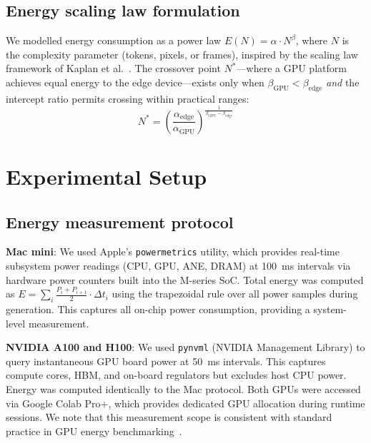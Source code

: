 \documentclass[preprint,12pt]{elsarticle}
\begin{document}
\subsection{Energy scaling law formulation}

We modelled energy consumption as a power law $E(N) = \alpha \cdot N^\beta$, where $N$ is the complexity parameter (tokens, pixels, or frames), inspired by the scaling law framework of Kaplan et al.~\cite{kaplan2020scaling}. The crossover point $N^*$---where a GPU platform achieves equal energy to the edge device---exists only when $\beta_\text{GPU} < \beta_\text{edge}$ \textit{and} the intercept ratio permits crossing within practical ranges:
\begin{equation}
N^* = \left(\frac{\alpha_\text{edge}}{\alpha_\text{GPU}}\right)^{\frac{1}{\beta_\text{GPU} - \beta_\text{edge}}}
\end{equation}

\section{Experimental Setup}
\label{sec:experimental}

\subsection{Energy measurement protocol}

\textbf{Mac mini}: We used Apple's \texttt{powermetrics} utility, which provides real-time subsystem power readings (CPU, GPU, ANE, DRAM) at 100~ms intervals via hardware power counters built into the M-series SoC. Total energy was computed as $E = \sum_{i} \frac{P_i + P_{i+1}}{2} \cdot \Delta t_i$ using the trapezoidal rule over all power samples during generation. This captures all on-chip power consumption, providing a system-level measurement.

\textbf{NVIDIA A100 and H100}: We used \texttt{pynvml} (NVIDIA Management Library) to query instantaneous GPU board power at 50~ms intervals. This captures compute cores, HBM, and on-board regulators but excludes host CPU power. Energy was computed identically to the Mac protocol. Both GPUs were accessed via Google Colab Pro+, which provides dedicated GPU allocation during runtime sessions. We note that this measurement scope is consistent with standard practice in GPU energy benchmarking~\cite{you2023zeus,samsi2023words,luccioni2024power}.
\end{document}
